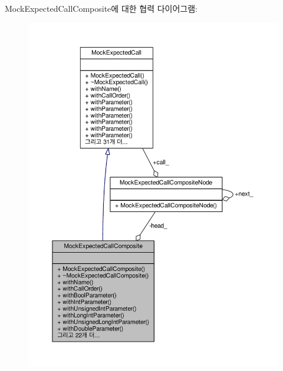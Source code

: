 Mock\+Expected\+Call\+Composite에 대한 협력 다이어그램\+:
\nopagebreak
\begin{figure}[H]
\begin{center}
\leavevmode
\includegraphics[width=350pt]{class_mock_expected_call_composite__coll__graph}
\end{center}
\end{figure}
